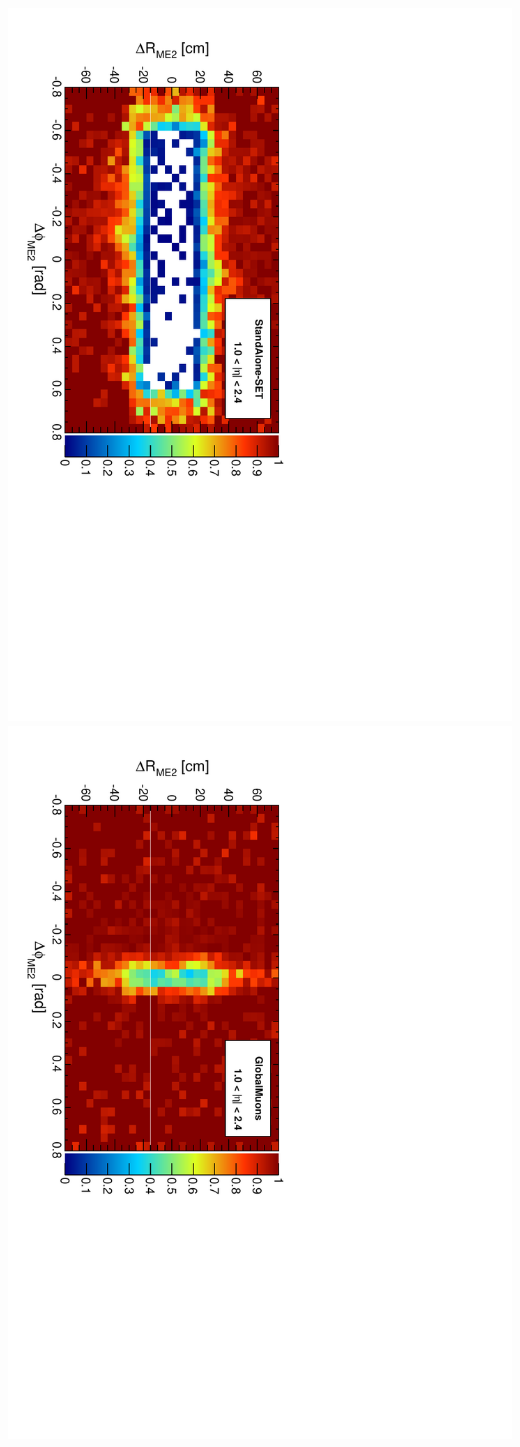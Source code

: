 \documentclass[compress]{beamer}
\begin{document}
\begin{frame}
\includegraphics[height=0.45\linewidth, angle=90]{me2_StandAloneUpdatedSET.pdf}
\includegraphics[height=0.45\linewidth, angle=90]{me2_GlobalMuons.pdf}
\end{frame}
\end{document}
